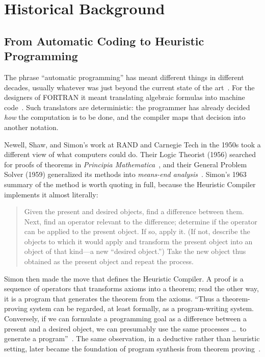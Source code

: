 \documentclass[11pt]{article}
\begin{document}
\section{Historical Background}
\label{sec:history}

\subsection{From Automatic Coding to Heuristic Programming}

The phrase ``automatic programming'' has meant different things in
different decades, usually whatever was just beyond the current state
of the art~\cite{balzer1985,richwaters1988myths}. For the designers of
FORTRAN it meant translating algebraic formulas into machine
code~\cite{backus1957fortran}. Such translators are deterministic: the
programmer has already decided \emph{how} the computation is to be done,
and the compiler maps that decision into another notation.

Newell, Shaw, and Simon's work at RAND and Carnegie Tech in the 1950s
took a different view of what computers could do. Their Logic Theorist
(1956) searched for proofs of theorems in \textit{Principia
Mathematica}~\cite{LT1957,moewsshrager2026}, and their General Problem
Solver (1959) generalized its methods into \emph{means-end
analysis}~\cite{newell1959gps}. Simon's 1963 summary of the method is
worth quoting in full, because the Heuristic Compiler implements it
almost literally:

\begin{quote}
Given the present and desired objects, find a difference between them.
Next, find an operator relevant to the difference; determine if the
operator can be applied to the present object. If so, apply it. (If
not, describe the objects to which it would apply and transform the
present object into an object of that kind---a new ``desired
object.'') Take the new object thus obtained as the present object and
repeat the process.~\cite[p.~494]{simon1963jacm}
\end{quote}

Simon then made the move that defines the Heuristic Compiler. A proof
is a sequence of operators that transforms axioms into a theorem; read
the other way, it is a program that generates the theorem from the
axioms. ``Thus a theorem-proving system can be regarded, at least
formally, as a program-writing system. Conversely, if we can formulate
a programming goal as a difference between a present and a desired
object, we can presumably use the same processes \ldots\ to generate a
program''~\cite[p.~495]{simon1963jacm}. The same observation, in a
deductive rather than heuristic setting, later became the foundation of
program synthesis from theorem
proving~\cite{green1969,mannawaldinger1971}.
\end{document}
